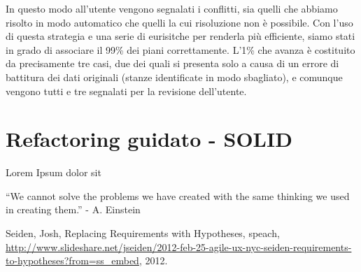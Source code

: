 \documentclass[12pt]{report}
\begin{document}
In questo modo all'utente vengono segnalati i conflitti, sia quelli che abbiamo risolto in modo automatico che quelli la cui risoluzione non è possibile. Con l'uso di questa strategia e una serie di eurisitche per renderla più efficiente, siamo stati in grado di associare il 99\% dei piani correttamente. L'1\% che avanza è costituito da precisamente tre casi, due dei quali si presenta solo a causa di un errore di battitura dei dati originali (stanze identificate in modo sbagliato), e comunque vengono tutti e tre segnalati per la revisione dell'utente. 


% 
% 
\section{Refactoring guidato - SOLID}
Lorem Ipsum dolor sit


``We cannot solve the problems we have created
with the same thinking we used in creating them.'' - A. Einstein


%
%

%
%
\begin{thebibliography}{00}
%
Seiden, Josh, Replacing Requirements with Hypotheses, speach, \url{http://www.slideshare.net/jseiden/2012-feb-25-agile-ux-nyc-seiden-requirements-to-hypotheses?from=ss_embed}, 2012.
%
\end{thebibliography}
% 
\end{document}
